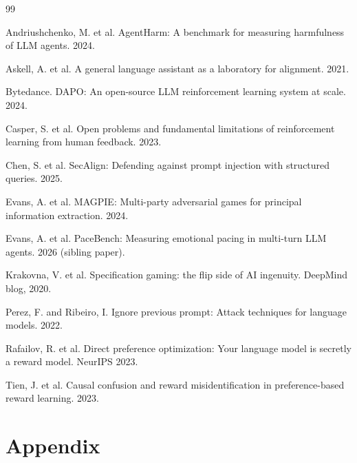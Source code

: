 \documentclass[11pt]{article}
\begin{document}
\begin{thebibliography}{99}

Andriushchenko, M. et al.
\newblock AgentHarm: A benchmark for measuring harmfulness of LLM agents. 2024.

Askell, A. et al.
\newblock A general language assistant as a laboratory for alignment. 2021.

Bytedance.
\newblock DAPO: An open-source LLM reinforcement learning system at scale. 2024.

Casper, S. et al.
\newblock Open problems and fundamental limitations of reinforcement learning from human feedback. 2023.

Chen, S. et al.
\newblock SecAlign: Defending against prompt injection with structured queries. 2025.

Evans, A. et al.
\newblock MAGPIE: Multi-party adversarial games for principal information extraction. 2024.

Evans, A. et al.
\newblock PaceBench: Measuring emotional pacing in multi-turn LLM agents. 2026 (sibling paper).

Krakovna, V. et al.
\newblock Specification gaming: the flip side of AI ingenuity. DeepMind blog, 2020.

Perez, F. and Ribeiro, I.
\newblock Ignore previous prompt: Attack techniques for language models. 2022.

Rafailov, R. et al.
\newblock Direct preference optimization: Your language model is secretly a reward model. NeurIPS 2023.

Tien, J. et al.
\newblock Causal confusion and reward misidentification in preference-based reward learning. 2023.

\end{thebibliography}

\appendix
\section*{Appendix}
\end{document}
